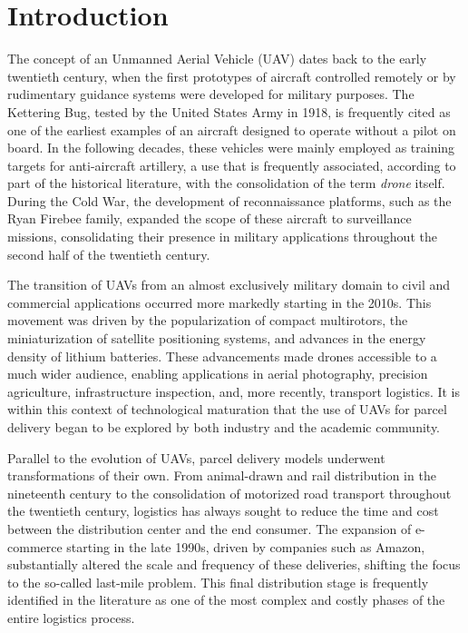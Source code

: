 \chapter{Introduction}\label{cap:intro}

The concept of an Unmanned Aerial Vehicle (UAV) dates back to the early twentieth century, when the first prototypes of aircraft controlled remotely or by rudimentary guidance systems were developed for military purposes. The Kettering Bug, tested by the United States Army in 1918, is frequently cited as one of the earliest examples of an aircraft designed to operate without a pilot on board. In the following decades, these vehicles were mainly employed as training targets for anti-aircraft artillery, a use that is frequently associated, according to part of the historical literature, with the consolidation of the term \textit{drone} itself. During the Cold War, the development of reconnaissance platforms, such as the Ryan Firebee family, expanded the scope of these aircraft to surveillance missions, consolidating their presence in military applications throughout the second half of the twentieth century.

The transition of UAVs from an almost exclusively military domain to civil and commercial applications occurred more markedly starting in the 2010s. This movement was driven by the popularization of compact multirotors, the miniaturization of satellite positioning systems, and advances in the energy density of lithium batteries. These advancements made drones accessible to a much wider audience, enabling applications in aerial photography, precision agriculture, infrastructure inspection, and, more recently, transport logistics. It is within this context of technological maturation that the use of UAVs for parcel delivery began to be explored by both industry and the academic community.

Parallel to the evolution of UAVs, parcel delivery models underwent transformations of their own. From animal-drawn and rail distribution in the nineteenth century to the consolidation of motorized road transport throughout the twentieth century, logistics has always sought to reduce the time and cost between the distribution center and the end consumer. The expansion of e-commerce starting in the late 1990s, driven by companies such as Amazon, substantially altered the scale and frequency of these deliveries, shifting the focus to the so-called last-mile problem. This final distribution stage is frequently identified in the literature as one of the most complex and costly phases of the entire logistics process.

